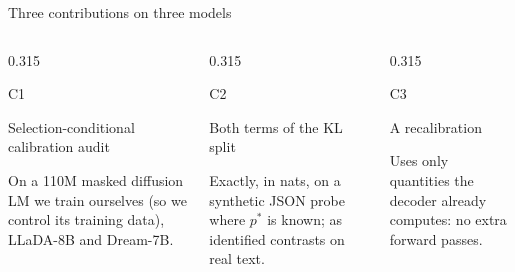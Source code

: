 \documentclass[aspectratio=169,10pt,t]{beamer}
\newcommand{\paneltitle}[1]{{\color{accentdark}\small\firasemibold #1}\par\vspace{0.8mm}}
\begin{document}
\begin{frame}{Three contributions on three models}
  \vspace{2mm}
  \begin{columns}[T,onlytextwidth]
    \begin{column}{0.315\textwidth}
      \begin{panel}[height=29mm]
        {\color{accent}\fontsize{16}{18}\selectfont\firasemibold C1}\par\vspace{0.8mm}
        \paneltitle{Selection-conditional calibration audit}
        On a 110M masked diffusion LM we train ourselves (so we control its training data),
        LLaDA-8B and Dream-7B.
      \end{panel}
    \end{column}
    \begin{column}{0.315\textwidth}
      \begin{panel}[height=29mm]
        {\color{accent}\fontsize{16}{18}\selectfont\firasemibold C2}\par\vspace{0.8mm}
        \paneltitle{Both terms of the KL split}
        Exactly, in nats, on a synthetic JSON probe where $p^{*}$ is known; as identified
        contrasts on real text.
      \end{panel}
    \end{column}
    \begin{column}{0.315\textwidth}
      \begin{panel}[height=29mm]
        {\color{accent}\fontsize{16}{18}\selectfont\firasemibold C3}\par\vspace{0.8mm}
        \paneltitle{A recalibration}
        Uses only quantities the decoder already computes: no extra forward passes.
      \end{panel}
    \end{column}
  \end{columns}
\end{frame}
\end{document}
